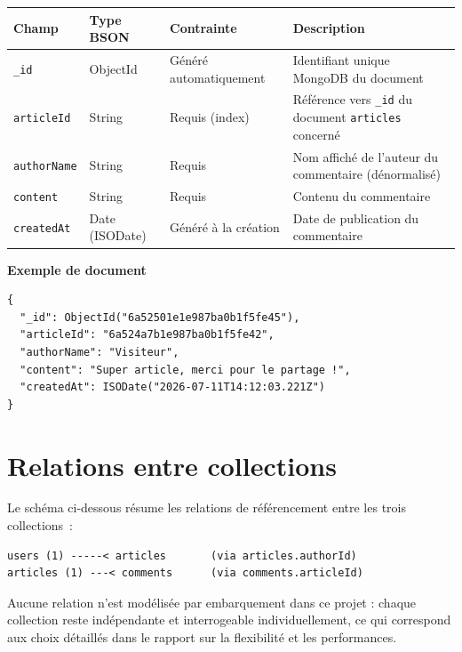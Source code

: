 \documentclass[11pt,a4paper]{article}
\begin{document}
\begin{longtable}{p{2cm}p{2cm}p{2.8cm}p{5cm}}
\toprule
\textbf{Champ} & \textbf{Type BSON} & \textbf{Contrainte} & \textbf{Description} \\
\midrule
\endhead
\texttt{\_id} & ObjectId & Généré automatiquement & Identifiant unique MongoDB du document \\
\texttt{articleId} & String & Requis (index) & Référence vers \texttt{\_id} du document \texttt{articles} concerné \\
\texttt{authorName} & String & Requis & Nom affiché de l'auteur du commentaire (dénormalisé) \\
\texttt{content} & String & Requis & Contenu du commentaire \\
\texttt{createdAt} & Date (ISODate) & Généré à la création & Date de publication du commentaire \\
\bottomrule
\end{longtable}

\noindent\textbf{Exemple de document}
\begin{lstlisting}
{
  "_id": ObjectId("6a52501e1e987ba0b1f5fe45"),
  "articleId": "6a524a7b1e987ba0b1f5fe42",
  "authorName": "Visiteur",
  "content": "Super article, merci pour le partage !",
  "createdAt": ISODate("2026-07-11T14:12:03.221Z")
}
\end{lstlisting}

\section{Relations entre collections}
Le schéma ci-dessous résume les relations de référencement entre les trois collections~:

\begin{lstlisting}
users (1) -----< articles       (via articles.authorId)
articles (1) ---< comments      (via comments.articleId)
\end{lstlisting}

\noindent Aucune relation n'est modélisée par embarquement dans ce projet : chaque collection reste indépendante et interrogeable individuellement, ce qui correspond aux choix détaillés dans le rapport sur la flexibilité et les performances.
\end{document}

